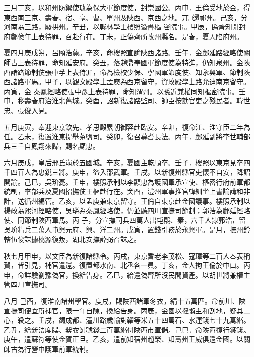 \begin{pinyinscope}
 三月丁亥，以和州防禦使璩為保大軍節度使，封崇國公。丙申，王倫受地於金，得東西南三京、壽春、宿、亳、曹、單州及陜西、京西之地。兀□還祁州。己亥，分河南為三路，廢拱州。辛丑，以翰林學士樓照簽書樞
 密院事。甲辰，偽齊知開封府鄭億年上表待罪，召赴行在。丁未，正偽齊所改州縣名。是春，夏人陷府州。



 夏四月庚戌朔，呂頤浩薨。辛亥，命樓照宣諭陜西諸路。壬午，金鄜延路經略使關師古上表待罪，命知延安府。癸丑，落趙鼎奉國軍節度使為特進，仍知泉州。金陜西諸路節制使張中孚上表待罪，命為檢校少保、寧國軍節度使、知永興軍、節制陜西諸路軍馬。甲子，以觀文殿學士孟庾為西京留守，資政殿學士路允迪南京留守。丙寅，金
 秦鳳經略使張中彥上表待罪，命知渭州。以孫近兼權同知樞密院事。壬申，移壽春府治淮北舊城。癸酉，詔新復諸路監司、帥臣按劾官吏之殘民者。韓世忠、張俊入見。



 五月庚寅，奉迎東京欽先、孝思殿累朝御容赴臨安。辛卯，復命江、淮守臣二年為任。乙未，復置淮東提舉茶鹽司。癸卯，復召募耆長法。丙午，鄜延副將李世輔部兵三千自鳳翔來歸，賜名顯忠。



 六月庚戌，皇后邢氏崩於五國城。辛亥，夏國主乾順卒。壬子，樓照以東京見卒四
 千四百人為忠銳三將。庚申，盜入邵武軍。壬戌，以新復州縣官吏懷不自安，降詔開諭。己巳，吳玠薨。壬申，樓照承制以李顯忠為護國軍承宣使、樞密行府前軍都統制，率部兵及夏國招撫使王樞赴行在。癸酉，澧州軍事推官韓紃坐上書論講和非計，送循州編管。乙亥，以孟庾兼東京留守。王倫自東京赴金國議事。樓照承制以楊政為熙河經略使，吳璘為秦鳳經略使，仍並聽四川宣撫司節制；郭浩為鄜延經略使、同節制陜西軍馬。丙
 子，分宣撫司兵四萬人出屯熙、秦，六千人隸郭浩，留吳玠精兵二萬人屯興元府、興、洋二州。戊寅，置錢引務於永興軍。是月，撫州鈐轄伍俊謀據桃源復叛，湖北安撫薛弼召誅之。



 秋七月甲申，以文臣為新復諸縣令。丙戌，東京耆老李茂松、寇璋等二百人奉表稱賀，皆引見，補官遣還。復置都水南、北丞各一員。丁亥，金人拘王倫於中山。丙申，命詳驗劉豫偽官，換給告身。乙巳，給還偽齊所沒民間資產。以胡世將兼權主管四川宣撫司。



 八月
 己酉，復淮南諸州學官。庚戌，賜陜西諸軍冬衣，絹十五萬匹。命前川、陜宣撫司便宜所補官，限一年自陳，換給告身。丙辰，金國以撻懶主和割地，疑其二心，殺之。壬戌，蠲成都、潼川路歲輸對糴等米五十四萬石、水運錢七十九萬緡。乙丑，給新法度牒、紫衣師號錢二百萬緡付陜西市軍儲。己巳，命陜西復行鐵錢。庚午，遣蘇符等使金賀正旦。乙亥，遣前知宿州趙榮、知壽州王威俱還金國。以關師古為行營中護軍前軍統制。




\end{pinyinscope}
